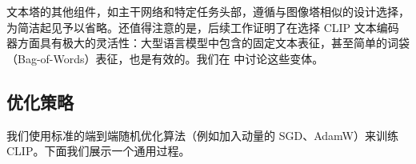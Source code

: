 \documentclass[../../book-main_zh.tex]{subfiles}
\begin{document}
文本塔的其他组件，如主干网络和特定任务头部，遵循与图像塔相似的设计选择，为简洁起见予以省略。还值得注意的是，后续工作证明了在选择 CLIP 文本编码器方面具有极大的灵活性：大型语言模型中包含的固定文本表征，甚至简单的词袋（Bag-of-Words）表征，也是有效的。我们在  中讨论这些变体。




\subsection{优化策略}
我们使用标准的端到端随机优化算法（例如加入动量的 SGD、AdamW）来训练 CLIP。下面我们展示一个通用过程。
\end{document}
